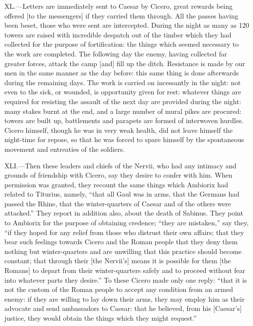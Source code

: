 XL.—Letters are immediately sent to Caesar by Cicero, great rewards
being offered [to the messengers] if they carried them through. All the
passes having been beset, those who were sent are intercepted. During
the night as many as 120 towers are raised with incredible despatch out
of the timber which they had collected for the purpose of fortification:
the things which seemed necessary to the work are completed. The
following day the enemy, having collected far greater forces, attack the
camp [and] fill up the ditch. Resistance is made by our men in the same
manner as the day before: this same thing is done afterwards during the
remaining days. The work is carried on incessantly in the night: not
even to the sick, or wounded, is opportunity given for rest: whatever
things are required for resisting the assault of the next day are
provided during the night: many stakes burnt at the end, and a large
number of mural pikes are procured: towers are built up, battlements and
parapets are formed of interwoven hurdles. Cicero himself, though he was
in very weak health, did not leave himself the night-time for repose, so
that he was forced to spare himself by the spontaneous movement and
entreaties of the soldiers.

XLI.—Then these leaders and chiefs of the Nervii, who had any intimacy
and grounds of friendship with Cicero, say they desire to confer with
him. When permission was granted, they recount the same things which
Ambiorix had related to Titurius, namely, ``that all Gaul was in arms,
that the Germans had passed the Rhine, that the winter-quarters of
Caesar and of the others were attacked.'' They report in addition also,
about the death of Sabinus. They point to Ambiorix for the purpose of
obtaining credence; ``they are mistaken,'' say they, ``if they hoped for
any relief from those who distrust their own affairs; that they bear
such feelings towards Cicero and the Roman people that they deny them
nothing but winter-quarters and are unwilling that this practice should
become constant; that through their [the Nervii's] means it is possible
for them [the Romans] to depart from their winter-quarters safely and to
proceed without fear into whatever parts they desire.'' To these Cicero
made only one reply: ``that it is not the custom of the Roman people to
accept any condition from an armed enemy: if they are willing to lay
down their arms, they may employ him as their advocate and send
ambassadors to Caesar: that he believed, from his [Caesar's] justice,
they would obtain the things which they might request.''


